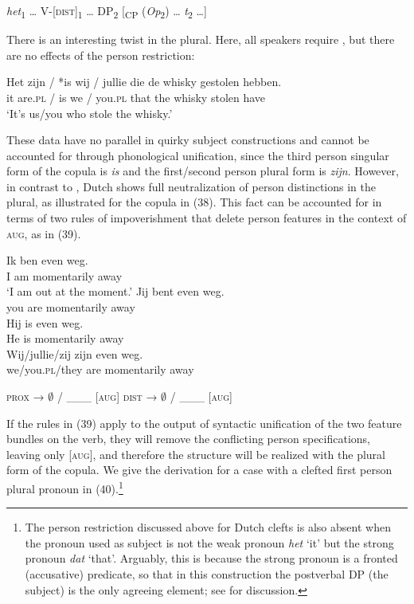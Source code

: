 \documentclass[output=paper]{langsci/langscibook}
\begin{document}
\ea 
 \textit{het}\textsubscript{1} … V-[\textsc{dist}]\textsubscript{1} … DP\textsubscript{2} [\textsubscript{CP} (\textit{Op}\textsubscript{2}) … \textit{t}\textsubscript{2} …]
\z

There is an interesting twist in the plural. Here, all speakers require , but there are no effects of the person restriction:

\ea 
 \gll  Het zijn / *is   wij / jullie  die  de  whisky gestolen hebben.\\
      it    are.\textsc{pl} / is we / you.\textsc{pl} that the whisky stolen     have\\
 \glt    ‘It’s us/you who stole the whisky.’
\z



These data have no parallel in  quirky subject constructions and cannot be accounted for through phonological unification, since the third person singular form of the copula is \textit{is} and the first\slash second person plural form is \textit{zijn}. However, in contrast to , Dutch shows full neutralization of person distinctions in the plural, as illustrated for the copula in (38). This fact can be accounted for in terms of two rules of impoverishment that delete person features in the context of \textsc{aug}, as in (39).

\ea \label{bkm:Ref295574585}  
\ea \gll Ik ben even              weg.\\
    I   am  momentarily away\\
\glt ‘I am out at the moment.’
\ex \gll Jij   bent even              weg.\\
    you are   momentarily away\\
\ex \gll  Hij is even             weg.\\
He is momentarily away\\
\ex \gll  Wij/jullie/zij     zijn even              weg.\\
    we/you.\textsc{pl}/they are   momentarily away\\
\z \z

\ea \label{bkm:Ref328734023}\label{bkm:Ref295642138}  
\ea \textsc{prox} → $\emptyset$ / \_\_\_ [\textsc{aug}]
\ex \textsc{dist} → $\emptyset$ / \_\_\_ [\textsc{aug}]
\z
\z

If the rules in (39) apply to the output of syntactic unification of the two feature bundles on the verb, they will remove the conflicting person specifications, leaving only [\textsc{aug}], and therefore the structure will be realized with the plural form of the copula. We give the derivation for a case with a clefted first person plural pronoun in (40).\footnote{The person restriction discussed above for Dutch clefts is also absent when the pronoun used as subject is not the weak pronoun \textit{het} ‘it’ but the strong pronoun \textit{dat} ‘that’. Arguably, this is because the strong pronoun is a fronted (accusative) predicate, so that in this construction the postverbal DP (the subject) is the only agreeing element; see \citet{Ackema2018} for discussion.}
\end{document}
